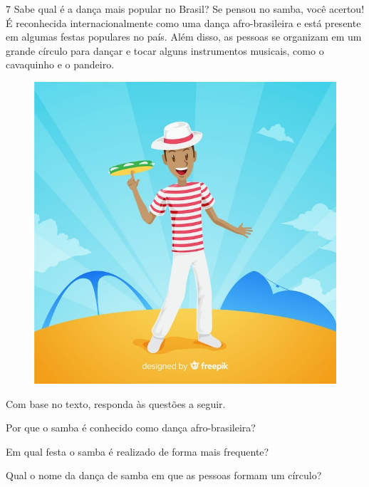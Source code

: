 
\num{7} Sabe qual é a dança mais popular no Brasil? Se pensou no samba, você
  acertou! É reconhecida internacionalmente como uma dança
  afro-brasileira e está presente em algumas festas populares no país.
  Além disso, as pessoas se organizam em um grande círculo para dançar e
  tocar alguns instrumentos musicais, como o cavaquinho e o pandeiro.

\begin{figure}[htpb!]
\includegraphics[width=\textwidth]{./imgs/img13.jpg}
\end{figure}

Com base no texto, responda às questões a seguir.

\begin{escolha}
\item Por que o samba é conhecido como dança afro-brasileira?


\item Em qual festa o samba é realizado de forma mais frequente?


\item Qual o nome da dança de samba em que as pessoas formam um círculo?

\end{escolha}

